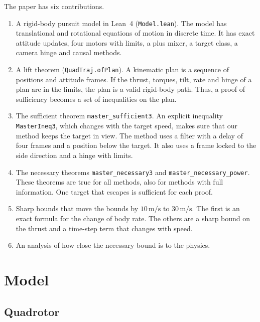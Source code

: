 \documentclass[11pt]{article}
\theoremstyle{definition}
\newcommand{\lean}[1]{\texttt{\small #1}}
\newcommand{\ms}{\,\mathrm{m/s}}
\begin{document}
The paper has six contributions.
\begin{enumerate}
\item A rigid-body pursuit model in Lean~4 (\lean{Model.lean}).
The model has translational and rotational equations of motion in discrete time.
It has exact attitude updates, four motors with limits, a plus mixer, a target class, a camera
hinge and causal methods.
\item A lift theorem (\lean{QuadTraj.ofPlan}).
A kinematic plan is a sequence of positions and attitude frames.
If the thrust, torques, tilt, rate and hinge of a plan are in the limits, the plan is a valid
rigid-body path.
Thus, a proof of sufficiency becomes a set of inequalities on the plan.
\item The sufficient theorem \lean{master\_sufficient3}.
An explicit inequality \lean{MasterIneq3}, which changes with the target speed, makes sure that our
method keeps the target in view.
The method uses a filter with a delay of four frames and a position below the target.
It also uses a frame locked to the side direction and a hinge with limits.
\item The necessary theorems \lean{master\_necessary3} and \lean{master\_necessary\_power}.
These theorems are true for all methods, also for methods with full information.
One target that escapes is sufficient for each proof.
\item Sharp bounds that move the bounds by $10\ms$ to $30\ms$.
The first is an exact formula for the change of body rate.
The others are a sharp bound on the thrust and a time-step term that changes with speed.
\item An analysis of how close the necessary bound is to the physics.
\end{enumerate}

\section{Model}

\subsection{Quadrotor}
\end{document}
